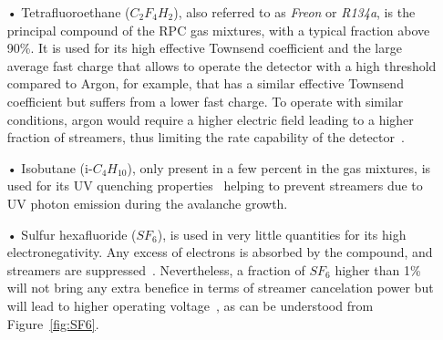\endgroup
	
	\begin{itemize}
		\item[•] Tetrafluoroethane ($C_2F_4H_2$), also referred to as \textit{Freon} or \textit{R134a}, is the principal compound of the RPC gas mixtures, with a typical fraction above 90\%. It is used for its high effective Townsend coefficient and the large average fast charge that allows to operate the detector with a high threshold compared to Argon, for example, that has a similar effective Townsend coefficient but suffers from a lower fast charge. To operate with similar conditions, argon would require a higher electric field leading to a higher fraction of streamers, thus limiting the rate capability of the detector~\cite{ABBRESCIA1997,ABBRESCIA1997PERF}.
		\item[•] Isobutane (i-$C_4H_{10}$), only present in a few percent in the gas mixtures, is used for its UV quenching properties~\cite{BATTISTONI85} helping to prevent streamers due to UV photon emission during the avalanche growth.
		\item[•] Sulfur hexafluoride ($SF_6$), is used in very little quantities for its high electronegativity. Any excess of electrons is absorbed by the compound, and streamers are suppressed~\cite{CAMARRI98,ZEBALLOS98}. Nevertheless, a fraction of $SF_6$ higher than 1\% will not bring any extra benefice in terms of streamer cancelation power but will lead to higher operating voltage~\cite{CAMARRI98}, as can be understood from Figure~\ref{fig:SF6}.
	\end{itemize}
	
